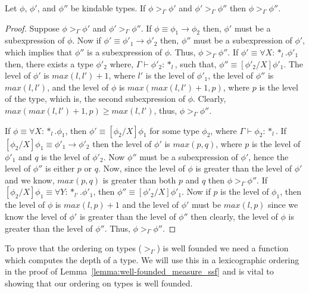 \begin{lemma}
  Let $\phi$, $\phi'$, and $\phi''$ be kindable types.  If $\phi >_\Gamma \phi'$ and 
  $\phi' >_\Gamma \phi''$ then $\phi >_\Gamma \phi''$.
  \label{lemma:transitivity_ssf}
\end{lemma}
\begin{proof}
  Suppose $\phi >_\Gamma \phi'$ and $\phi' >_\Gamma \phi''$.  If 
  $\phi \equiv \phi_1 \rightarrow \phi_2$ then,
  $\phi'$ must be a subexpression of $\phi$.  Now if $\phi' \equiv \phi'_1 \rightarrow \phi'_2$ 
  then,
  $\phi''$ must be a subexpression of $\phi'$, which implies that $\phi''$ is a subexpression of 
  $\phi$.  Thus, $\phi >_\Gamma \phi''$.
  If $\phi' \equiv \forall X:*_l.\phi'_1$ then, there exists a type $\phi'_2$ where, 
  $\Gamma \vdash \phi'_2:*_l$, such that, 
  $\phi'' \equiv [\phi'_2/X]\phi'_1$.  The level of $\phi'$ is $max(l,l')+1$, where $l'$ is the 
  level of $\phi'_1$, the level of 
  $\phi''$ is $max(l,l')$, and the level of $\phi$ is $max(max(l,l')+1,p)$, where $p$ is the 
  level of the type, which is, the second subexpression of $\phi$.
  Clearly, $max(max(l,l')+1,p) \geq max(l,l')$, thus, $\phi >_\Gamma \phi''$.

  If $\phi \equiv \forall X:*_l.\phi_1$, then $\phi' \equiv [\phi_2/X]\phi_1$ for some type 
  $\phi_2$, where $\Gamma \vdash \phi_2:*_l$.  If
  $[\phi_2/X]\phi_1 \equiv \phi'_1 \rightarrow \phi'_2$ then the level of $\phi'$ is $max(p,q)$, where 
  $p$ is the level
  of $\phi'_1$ and $q$ is the level of $\phi'_2$.  Now $\phi''$ must be a subexpression of 
  $\phi'$, hence the level of $\phi''$ is either $p$ or $q$.  Now, since
  the level of $\phi$ is greater than the level of $\phi'$ and we know, $max(p,q)$ is greater 
  than both $p$ and $q$ then $\phi >_\Gamma \phi''$.  If 
  $[\phi_2/X]\phi_1 \equiv \forall Y:*_{l'}.\phi'_1$, then $\phi'' \equiv [\phi'_2/X]\phi'_1$.  
  Now if $p$ is the level of $\phi_1$, then the level of $\phi$ is
  $max(l,p)+1$ and the level of $\phi'$ must be $max(l,p)$ since we know the level of $\phi'$ is 
  greater than the level of $\phi''$ then clearly, the level of 
  $\phi$ is greater than the level of $\phi''$.  Thus, $\phi >_\Gamma \phi''$.
\end{proof}
\noindent
To prove that the ordering on types ($>_\Gamma$) is well founded we need
a function which computes the depth of a type.  We will use this in a
lexicographic ordering in the proof of
Lemma~\ref{lemma:well-founded_measure_ssf} and is vital to showing
that our ordering on types is well founded.

